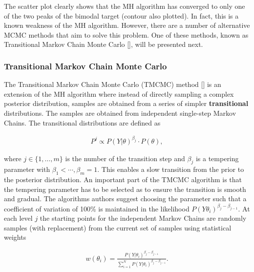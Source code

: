 The scatter plot clearly shows that the MH algorithm has converged to only one of the two peaks of the bimodal target (contour also plotted). In fact, this is a known weakness of the MH algorithm. However, there are a number of alternative MCMC methods that aim to solve this problem. One of these methods, known as Transitional Markov Chain Monte Carlo [], will be presented next.



\subsubsection{Transitional Markov Chain Monte Carlo}



\label{3180476064451849928}{}


The Transitional Markov Chain Monte Carlo (TMCMC) method [] is an extension of the MH algorithm where instead of directly sampling a complex posterior distribution, samples are obtained from a series of simpler \textbf{transitional} distributions. The samples are obtained from independent single-step Markov Chains. The transitional distributions are defined as



\begin{equation*}
\begin{split}    P^j \propto P(Y|\theta)^{\beta_j} \cdot P(\theta),\end{split}\end{equation*}


where \(j \in \{1, \ldots, m \}\) is the number of the transition step and \(\beta_j\) is a tempering parameter with \(\beta_1 < \cdots, \beta_m =1\). This enables a slow transition from the prior to the posterior distribution. An important part of the TMCMC algorithm is that the tempering parameter has to be selected as to ensure the transition is smooth and gradual. The algorithm{\textquotesingle}s authors suggest choosing the parameter such that a coefficient of variation of 100\% is maintained in the likelihood \(P(Y\theta_i)^{\beta_j-\beta_{j - 1}}\). At each level \(j\) the starting points for the independent Markov Chains are randomly samples (with replacement) from the current set of samples using statistical weights



\begin{equation*}
\begin{split}w(\theta_i) = \frac{P(Y|\theta_i)^{\beta_j-\beta_{j-1}}}{\sum_{i=1}^N P(Y|\theta_i)^{\beta_j-\beta_{j-1}}}.\end{split}\end{equation*}


